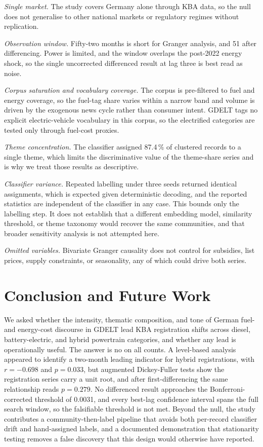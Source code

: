 \documentclass[conference]{IEEEtran}
\begin{document}
\emph{Single market.} The study covers Germany alone through KBA data, so the
null does not generalise to other national markets or regulatory regimes without
replication.

\emph{Observation window.} Fifty-two months is short for Granger analysis, and
51 after differencing. Power is limited, and the window overlaps the post-2022
energy shock, so the single uncorrected differenced result at lag three is best
read as noise.

\emph{Corpus saturation and vocabulary coverage.} The corpus is pre-filtered to
fuel and energy coverage, so the fuel-tag share varies within a narrow band and
volume is driven by the exogenous news cycle rather than consumer intent. GDELT
tags no explicit electric-vehicle vocabulary in this corpus, so the electrified
categories are tested only through fuel-cost proxies.

\emph{Theme concentration.} The classifier assigned 87.4\,\% of clustered
records to a single theme, which limits the discriminative value of the
theme-share series and is why we treat those results as descriptive.

\emph{Classifier variance.} Repeated labelling under three seeds returned
identical assignments, which is expected given deterministic decoding, and the
reported statistics are independent of the classifier in any case. This bounds
only the labelling step. It does not establish that a different embedding model,
similarity threshold, or theme taxonomy would recover the same communities, and
that broader sensitivity analysis is not attempted here.

\emph{Omitted variables.} Bivariate Granger causality does not control for
subsidies, list prices, supply constraints, or seasonality, any of which could
drive both series.

\section{Conclusion and Future Work}
We asked whether the intensity, thematic composition, and tone of German fuel-
and energy-cost discourse in GDELT lead KBA registration shifts across diesel,
battery-electric, and hybrid powertrain categories, and whether any lead is
operationally useful. The answer is no on all counts. A level-based analysis
appeared to identify a two-month leading indicator for hybrid registrations,
with $r=-0.698$ and $p=0.033$, but augmented Dickey-Fuller tests show the
registration series carry a unit root, and after first-differencing the same
relationship reads $p=0.279$. No differenced result approaches the
Bonferroni-corrected threshold of 0.0031, and every best-lag confidence interval
spans the full search window, so the falsifiable threshold is not met. Beyond
the null, the study contributes a community-then-label pipeline that avoids both
per-record classifier drift and hand-assigned labels, and a documented
demonstration that stationarity testing removes a false discovery that this
design would otherwise have reported.
\end{document}
